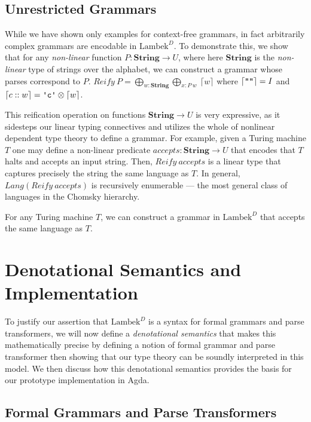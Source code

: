 \documentclass[acmsmall,nonacm]{acmart}
\newcommand{\StringSem}{\mathbf{String}}
\newcommand{\theoryabbv}{$\textrm{Lambek}^D$\xspace}
\newcommand{\literal}[1]{\texttt{\textquotesingle#1\textquotesingle}}
\newcommand{\stringquote}[1]{\texttt{\textquotedbl#1\textquotedbl}}
\newcommand{\LinSigTy}[3]{\textstyle\bigoplus_{#1 : #2} #3}
\newcommand{\agdalogo}{%
  \usebox{\logoagdabox}}%
\newcommand{\zenodolink}{https://zenodo.org/records/15049780}
\newcommand{\Agda}{\href{\zenodolink}{\agdalogo}}
\begin{document}
{\subsection{Unrestricted Grammars}

While we have shown only examples for context-free grammars, in fact
arbitrarily complex grammars are encodable in \theoryabbv. To
demonstrate this, we show that for any \emph{non-linear} function $P :
\StringSem \to U$, where here $\StringSem$ is the \emph{non-linear} type
of strings over the alphabet, we can construct a grammar whose parses
correspond to $P$.
\(
Reify~P = \LinSigTy{w} {\StringSem} {\LinSigTy {x} {P~w} {~\lceil w \rceil}}
\)
where $\lceil \stringquote{} \rceil = I$ and
$\lceil c :: w \rceil = \literal c \otimes \lceil w \rceil$.

This reification operation on functions $\StringSem \to U$ is very expressive,
as it sidesteps our linear typing connectives and utilizes the whole of nonlinear
dependent type theory to define a grammar. For example, given a
Turing machine $T$ one may
define a non-linear predicate $accepts : \StringSem \to U$ that encodes that $T$
halts and accepts an input string. Then, $Reify~accepts$ is a linear type that
captures precisely the string the same language as $T$. In general,
$Lang(Reify~accepts)$ is recursively enumerable --- the most general class of
languages in the Chomsky hierarchy.
\begin{construction}[\Agda]
  \label{cons:turing}
  For any Turing machine $T$, we can construct a grammar in \theoryabbv
  that accepts the same language as $T$.
\end{construction}

\section{Denotational Semantics and Implementation}
\label{sec:semantics-and-metatheory}

To justify our assertion that \theoryabbv is a syntax for formal
grammars and parse transformers, we will now define a
\emph{denotational semantics} that makes this mathematically precise
by defining a notion of formal grammar and parse transformer then
showing that our type theory can be soundly interpreted in this
model. We then discuss how this denotational semantics provides the
basis for our prototype implementation in Agda.

\subsection{Formal Grammars and Parse Transformers}

}
\end{document}
